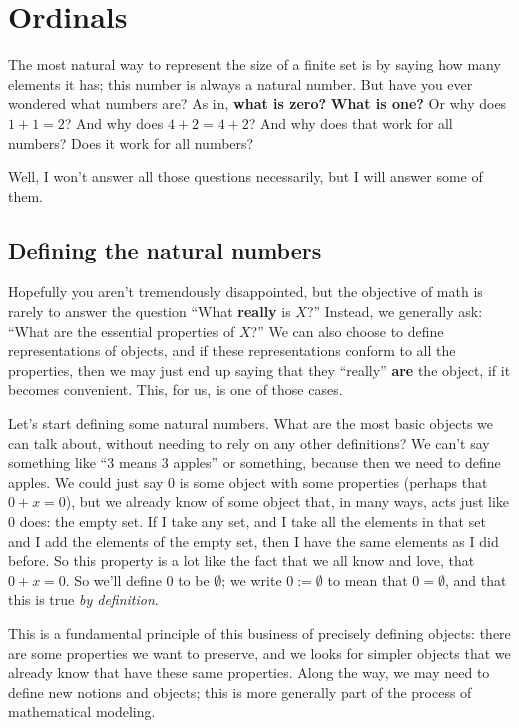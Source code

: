 \section{Ordinals}

The most natural way to represent the size of a finite set is by saying how many elements it has; this number is always a natural number.
But have you ever wondered what numbers are?
As in, \textbf{what is zero?}
\textbf{What is one?}
Or why does $1 + 1 = 2$?
And why does $4 + 2 = 4 + 2$?
And why does that work for all numbers?
Does it work for all numbers?

Well, I won't answer all those questions necessarily, but I will answer some of them.

\subsection{Defining the natural numbers}

Hopefully you aren't tremendously disappointed, but the objective of math is rarely to answer the question ``What \textbf{really} is $X$?''
Instead, we generally ask: ``What are the essential properties of $X$?''
We can also choose to define representations of objects, and if these representations conform to all the properties, then we may just end up saying that they ``really'' \textbf{are} the object, if it becomes convenient.
This, for us, is one of those cases.

Let's start defining some natural numbers.
What are the most basic objects we can talk about, without needing to rely on any other definitions?
We can't say something like ``$3$ means $3$ apples'' or something, because then we need to define apples.
We could just say $0$ is some object with some properties (perhaps that $0 + x = 0$), but we already know of some object that, in many ways, acts just like $0$ does: the empty set.
If I take any set, and I take all the elements in that set and I add the elements of the empty set, then I have the same elements as I did before.
So this property is a lot like the fact that we all know and love, that $0 + x = 0$.
So we'll define $0$ to be $\emptyset$; we write $0 := \emptyset$ to mean that $0 = \emptyset$, and that this is true \emph{by definition}.

This is a fundamental principle of this business of precisely defining objects: there are some properties we want to preserve, and we looks for simpler objects that we already know that have these same properties.
Along the way, we may need to define new notions  and objects; this is more generally part of the process of mathematical modeling.

